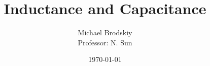 


\title{Inductance and Capacitance}
\date{\today}
\author{Michael Brodskiy\\ \small Professor: N. Sun}



\maketitle

